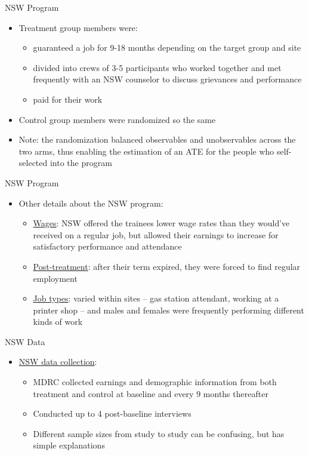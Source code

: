 \documentclass{beamer}
\begin{document}
\begin{frame}{NSW Program}
	
	\begin{itemize}
	\item Treatment group members were:
		\begin{itemize}
		\item guaranteed a job for 9-18 months depending on the target group and site
		\item divided into crews of 3-5 participants who worked together and met frequently with an NSW counselor to discuss grievances and performance
		\item paid for their work
		\end{itemize}
	\item Control group members were randomized so the same
	\item Note: the randomization balanced observables and unobservables across the two arms, thus enabling the estimation of an ATE for the people who self-selected into the program
	\end{itemize}
\end{frame}

\begin{frame}{NSW Program}

\begin{itemize}
	\item Other details about the NSW program:
		\begin{itemize}
		\item \underline{Wages}:  NSW offered the trainees lower wage rates than they would've received on a regular job, but allowed their earnings to increase for satisfactory performance and attendance
		\item \underline{Post-treatment}: after their term expired, they were forced to find regular employment
		\item \underline{Job types}:  varied within sites -- gas station attendant, working at a printer shop -- and males and females were frequently performing different kinds of work
		\end{itemize}
\end{itemize}

\end{frame}
	
\begin{frame}{NSW Data}
	
	\begin{itemize}
	\item \underline{NSW data collection}:
		\begin{itemize}
		\item MDRC collected earnings and demographic information from both treatment and control at baseline and every 9 months thereafter
		\item Conducted up to 4 post-baseline interviews
		\item Different sample sizes from study to study can be confusing, but has simple explanations
		\end{itemize}
	\end{itemize}
\end{frame}
	
\end{document}
